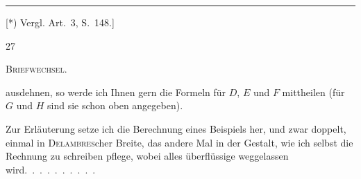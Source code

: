 \par\medskip\noindent\rule{4cm}{.4pt}\par
{\footnotesize [*) Vergl. Art.~3, S.~148.]\par}
\vfill{}\hfill27\hfill\mbox{}\par
\clearpage
{}\hfill\textsc{Briefwechsel.}\hfill\mbox{}\par\medskip
\noindent ausdehnen, so werde ich Ihnen gern die Formeln für $D$, $E$ und $F$ mittheilen (für $G$ und $H$ sind sie schon oben angegeben).

Zur Erläuterung setze ich die Berechnung eines Beispiels her, und zwar doppelt, einmal in \textsc{Delambres}cher Breite, das andere Mal in der Gestalt, wie ich selbst die Rechnung zu schreiben pflege, wobei alles überflüssige weggelassen wird.\ .\ .\ .\ .\ .\ .\ .\ .\ .
